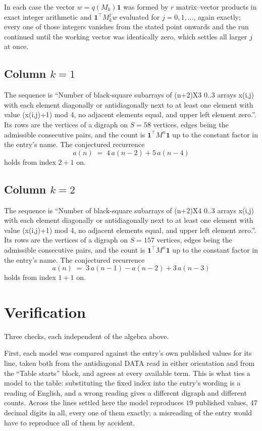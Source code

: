 \documentclass[11pt,a4paper]{article}
\theoremstyle{plain}
\theoremstyle{definition}
\begin{document}
In each case the vector $w=q(M_k)\mathbf{1}$ was formed by $r$ matrix--vector products in
exact integer arithmetic and $\mathbf{1}^{\!\top}M_k^{j}w$ evaluated for $j=0,1,\dots$,
again exactly; every one of those integers vanishes from the stated point onwards and the run
continued until the working vector was identically zero, which settles all larger $j$ at once.

\subsection*{Column $k$$=1$}
The sequence is ``Number of black-square subarrays of (n+2)X3 0..3 arrays x(i,j) with each element diagonally or antidiagonally next to at least one element with value (x(i,j)+1) mod 4, no adjacent elements equal, and upper left element zero.''. Its rows are the vertices of a digraph on
$S=58$ vertices, edges being the admissible consecutive pairs, and the count is
$\mathbf{1}^{\!\top}M^{n}\mathbf{1}$ up to the constant factor in the entry's name.
The conjectured recurrence
\[
a(n)\;=\;4\,a(n-2) + 5\,a(n-4)
\]
holds from index $2+1$ on.

\subsection*{Column $k$$=2$}
The sequence is ``Number of black-square subarrays of (n+2)X4 0..3 arrays x(i,j) with each element diagonally or antidiagonally next to at least one element with value (x(i,j)+1) mod 4, no adjacent elements equal, and upper left element zero.''. Its rows are the vertices of a digraph on
$S=157$ vertices, edges being the admissible consecutive pairs, and the count is
$\mathbf{1}^{\!\top}M^{n}\mathbf{1}$ up to the constant factor in the entry's name.
The conjectured recurrence
\[
a(n)\;=\;3\,a(n-1) - a(n-2) + 3\,a(n-3)
\]
holds from index $1+1$ on.

\section{Verification}

Three checks, each independent of the algebra above.

First, each model was compared against the entry's own published values for its line, taken
both from the antidiagonal DATA read in either orientation and from the ``Table starts''
block, and agrees at every available term. This is what ties a model to the table:
substituting the fixed index into the entry's wording is a reading of English, and a wrong
reading gives a different digraph and different counts. Across the lines settled here the
model reproduces $19$ published values, $47$ decimal digits in all, every one of
them exactly; a misreading of the entry would have to reproduce all of them by accident.
\end{document}
